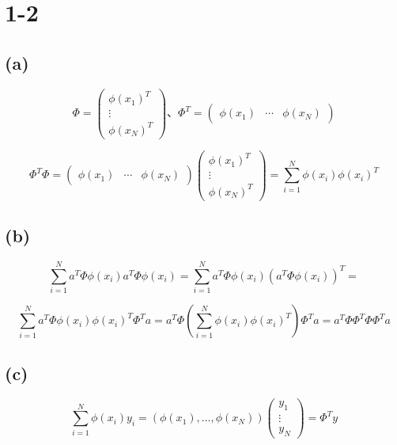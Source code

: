 \documentclass[a4paper,11pt]{jsarticle}
\begin{document}
\section*{1-2}
\subsection*{(a)}

\begin{equation*}
  \Phi = 
    \begin{pmatrix}
      \phi(x_1)^T \\
      \vdots \\
      \phi(x_N)^T 
    \end{pmatrix}、
  \Phi^T = 
    \begin{pmatrix}
      \phi(x_1) & \cdots & \phi(x_N)
    \end{pmatrix}
\end{equation*}

\begin{equation*}
  \Phi^T \Phi = 
    \begin{pmatrix}
      \phi(x_1) & \cdots & \phi(x_N)
    \end{pmatrix}
    \begin{pmatrix}
      \phi(x_1)^T \\
      \vdots \\
      \phi(x_N)^T 
    \end{pmatrix}
  = 
    \sum_{i=1}^{N} \phi(x_i) \phi(x_i)^T
\end{equation*}

\subsection*{(b)}
\begin{equation*}
  \sum_{i=1}^{N} a^T \Phi \phi(x_i) a^T \Phi \phi(x_i) = 
  \sum_{i=1}^{N} a^T \Phi \phi(x_i) (a^T \Phi \phi(x_i))^T = 
\end{equation*}

\begin{equation*}
  \sum_{i=1}^{N} a^T \Phi \phi(x_i) \phi(x_i)^T \Phi^T a =
  a^T \Phi (\sum_{i=1}^{N} \phi(x_i) \phi(x_i)^T) \Phi^T a =
  a^T \Phi \Phi^T \Phi \Phi^T a
\end{equation*}

\subsection*{(c)}

\begin{equation*}
  \sum_{i=1}^{N} \phi(x_i)y_i =
    (\phi(x_1), \ldots, \phi(x_N))
    \begin{pmatrix}
      y_1 \\
      \vdots \\
      y_N
    \end{pmatrix}
  = \Phi^T y
\end{equation*}
\end{document}
